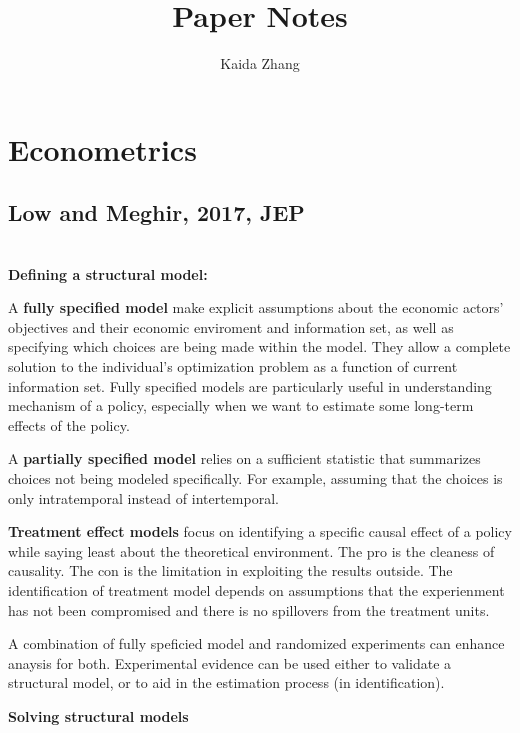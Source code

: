 \documentclass{book}
\title{Paper Notes}
\author{Kaida Zhang}
\date{}
\theoremstyle{plain}
\theoremstyle{definition}
\begin{document}

\tableofcontents{}
\setcounter{tocdepth}{1}			%


\chapter{Econometrics}
\label{cha:econometrics}


\section{Low and Meghir, 2017, JEP} %
\label{sec:low_and_meghir_jep_2017}

\textbf{}\\

\textbf{Defining a structural model:}

A \textbf{fully specified model} make explicit assumptions about the economic actors' objectives and their economic enviroment and information set, as well as specifying which choices are being made within the model. They allow a complete solution to the individual's optimization problem as a function of current information set.
Fully specified models are particularly useful in understanding mechanism of a policy, especially when we want to estimate some long-term effects of the policy.

A \textbf{partially specified model} relies on a sufficient statistic that summarizes choices not being modeled specifically. For example, assuming that the choices is only intratemporal instead of intertemporal.

\textbf{Treatment effect models} focus on identifying a specific causal effect of a policy while saying least about the theoretical environment. The pro is the cleaness of causality. The con is the limitation in exploiting the results outside. The identification of treatment model depends on assumptions that the experienment has not been compromised and there is no spillovers from the treatment units.

A combination of fully speficied model and randomized experiments can enhance anaysis for both. Experimental evidence can be used either to validate a structural model, or to aid in the estimation process (in identification).

\textbf{Solving structural models}
\end{document}
